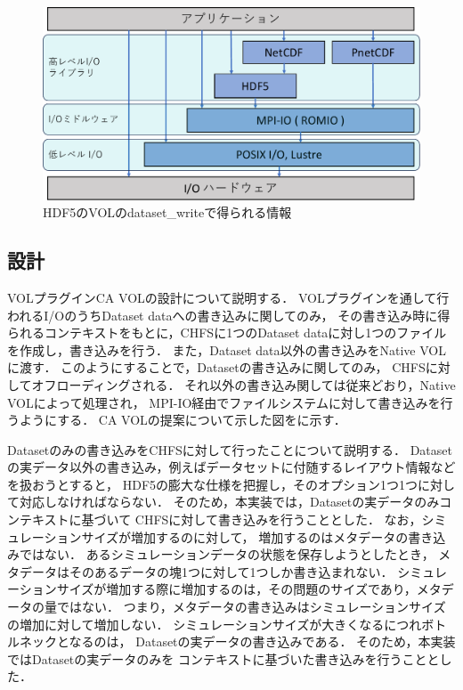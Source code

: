 \documentclass[submit,techrep,noauthor]{ipsj}
\begin{document}
\begin{figure}[t]
	\centering
	\includegraphics[page=16,width=\linewidth]{figure-crop.pdf}
	\caption{HDF5のVOLのdataset\_writeで得られる情報}
	\label{fig:hdf5infoinvol}
\end{figure}


\subsection{設計}
VOLプラグインCA VOLの設計について説明する．
VOLプラグインを通して行われるI/OのうちDataset dataへの書き込みに関してのみ，
その書き込み時に得られるコンテキストをもとに，CHFSに1つのDataset dataに対し1つのファイルを作成し，書き込みを行う．
また，Dataset data以外の書き込みをNative VOLに渡す．
このようにすることで，Datasetの書き込みに関してのみ，
CHFSに対してオフローディングされる．
それ以外の書き込み関しては従来どおり，Native VOLによって処理され，
MPI-IO経由でファイルシステムに対して書き込みを行うようにする．
CA VOLの提案について示した図をに示す．

Datasetのみの書き込みをCHFSに対して行ったことについて説明する．
Datasetの実データ以外の書き込み，例えばデータセットに付随するレイアウト情報などを扱おうとすると，
HDF5の膨大な仕様を把握し，そのオプション1つ1つに対して対応しなければならない．
そのため，本実装では，Datasetの実データのみコンテキストに基づいて
CHFSに対して書き込みを行うこととした．
なお，シミュレーションサイズが増加するのに対して，
増加するのはメタデータの書き込みではない．
あるシミュレーションデータの状態を保存しようとしたとき，
メタデータはそのあるデータの塊1つに対して1つしか書き込まれない．
シミュレーションサイズが増加する際に増加するのは，その問題のサイズであり，メタデータの量ではない．
つまり，メタデータの書き込みはシミュレーションサイズの増加に対して増加しない．
シミュレーションサイズが大きくなるにつれボトルネックとなるのは，
Datasetの実データの書き込みである．
そのため，本実装ではDatasetの実データのみを
コンテキストに基づいた書き込みを行うこととした．
\end{document}
